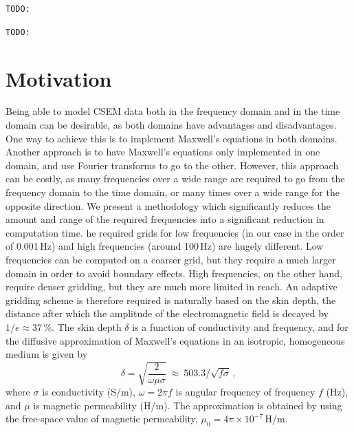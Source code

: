 \documentclass[extra, camera,%
    onecolumn,   %
    referee,     %
]{gji}
\newcommand{\rtodo}{{\color{red}\texttt{TODO:}}\xspace}
\begin{document}
\rtodo {}

\rtodo {}

\section{Motivation}  %

Being able to model CSEM data both in the frequency domain and in the time
domain can be desirable, as both domains have advantages and disadvantages. One
way to achieve this is to implement Maxwell's equations in both domains.
Another approach is to have Maxwell's equations only implemented in one domain,
and use Fourier transforms to go to the other. However, this approach can be
costly, as many frequencies over a wide range are required to go from the
frequency domain to the time domain, or many times over a wide range for the
opposite direction. We present a methodology which significantly reduces the
amount and range of the required frequencies into a significant reduction in
computation time. he required  grids
for low frequencies (in our case in the order of 0.001\,Hz) and high
frequencies (around 100\,Hz) are hugely different. Low frequencies can be
computed on a coarser grid, but they require a much larger domain in order to
avoid boundary effects. High frequencies, on the other hand, require denser
gridding, but they are much more limited in reach. An adaptive gridding scheme
is therefore required is naturally based on the skin depth,
 the distance after which the amplitude of the
electromagnetic field is decayed by $1/e\approx 37\,\%$. The skin depth
$\delta$ is a function of conductivity and frequency, and for the diffusive
approximation of Maxwell's equations in an isotropic, homogeneous medium is
given by \citep[e.g.,][\mbox{}]{B.SEG.88.Ward}
%
\begin{equation}
  \delta = \sqrt{\frac{2}{\omega\mu\sigma}}
  \ \approx \ 503.3/\sqrt{f\sigma} \, ,
  \label{eq:skindepth}
\end{equation}
%
where $\sigma$ is conductivity (S/m), $\omega=2\pi f$ is angular frequency of
frequency $f$ (Hz), and $\mu$ is magnetic permeability (H/m). The approximation
is obtained by using the free-space value of magnetic permeability,
$\mu_0=4\pi\times10^{-7}\,$H/m.
\end{document}
